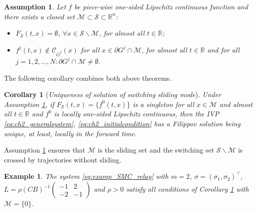 \documentclass{article}
\newcommand{\R}{\mathbb{R}}
\newtheorem{corollary}{Corollary}
\newtheorem{example}{Example}
\newtheorem{assumption}{Assumption}
\begin{document}
\begin{assumption}\label{as:uniq_3} \itshape
	Let $f$ be piece-wise one-sided Lipschitz continuous
	function  and there exists a closed set $\mathcal{M}\subset \mathcal{S}\subset \R^n$: 
	\begin{itemize}
		\item 
		$
		F_{\mathcal{S}}(t,x)=\emptyset$, $\forall x\!\in\! \mathcal{S}\backslash \mathcal{M}$, for
		almost all $t\!\in\!\R$;
		\item $f^j(t,x)\!\notin\! \mathcal{C}_{\bar G^j}(x)$ for all  $x\!\in\! \partial G^j\cap\mathcal{M}$,
		for almost all $t\!\in\!\R$ and  for all $j\!=\!1,2,...,N:\partial G^j\cap\mathcal{M}\neq \emptyset$.
	\end{itemize}
\end{assumption}
The following corollary combines both above theorems.
\begin{corollary}[\itshape \small Uniqueness of solution of switching sliding mode]\label{cor:uniqness_mix}\itshape
		Under Assumption \ref{as:uniq_3}, if 
	$F_{\mathcal{S}}(t,x)\!=\!\{f^0(t,x)\}$ is a singleton for all $x\!\in\! \mathcal{M}$ and  almost all $t\!\in\! \R$ and  $f^0$ is  locally one-sided Lipschitz continuous, then
		 the IVP  \eqref{eq:ch2_generalsystem}, \eqref{eq:ch2_initialcondition}  has a Filippov solution  being unique,  at least, locally in the forward time. 	
\end{corollary}

{Assumption \ref{as:uniq_3} ensures that $\mathcal{M}$ is the sliding set and the switching set $\mathcal{S}\backslash\mathcal{M}$ is crossed by trajectories without sliding.}
\begin{example}
	\itshape
	The system \eqref{eq:examp_SMC_relay} with 
	 $m=2$, $\sigma=(\sigma_1,\sigma_2)^{\top}$, $L=\rho(CB)^{-1} \left(\begin{smallmatrix} -1 & 2\\ -2 & -1\end{smallmatrix}\right)$ and  $\rho>0$ satisfy
	all conditions of Corollary \ref{cor:uniqness_mix} with $\mathcal{M}=\{0\}$.
\end{example}
\vspace{-2mm}
\end{document}
